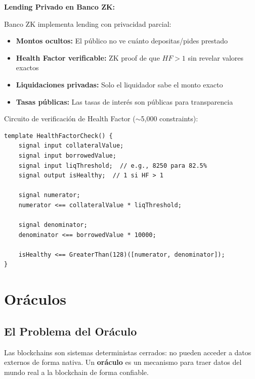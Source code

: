 \documentclass[11pt,a4paper,twoside]{book}
\begin{document}
\begin{bancozk}
\textbf{Lending Privado en Banco ZK:}

Banco ZK implementa lending con privacidad parcial:

\begin{itemize}
    \item \textbf{Montos ocultos:} El p\'ublico no ve cu\'anto depositas/pides prestado
    \item \textbf{Health Factor verificable:} ZK proof de que $HF > 1$ sin revelar valores exactos
    \item \textbf{Liquidaciones privadas:} Solo el liquidador sabe el monto exacto
    \item \textbf{Tasas p\'ublicas:} Las tasas de inter\'es son p\'ublicas para transparencia
\end{itemize}

Circuito de verificaci\'on de Health Factor ($\sim$5,000 constraints):
\begin{verbatim}
template HealthFactorCheck() {
    signal input collateralValue;
    signal input borrowedValue;
    signal input liqThreshold;  // e.g., 8250 para 82.5%
    signal output isHealthy;  // 1 si HF > 1
    
    signal numerator;
    numerator <== collateralValue * liqThreshold;
    
    signal denominator;
    denominator <== borrowedValue * 10000;
    
    isHealthy <== GreaterThan(128)([numerator, denominator]);
}
\end{verbatim}
\end{bancozk}

\section{Or\'aculos}
\label{sec:oracles}

\subsection{El Problema del Or\'aculo}

\begin{definition}
Las blockchains son sistemas deterministas cerrados: no pueden acceder a datos externos de forma nativa. Un \textbf{or\'aculo} es un mecanismo para traer datos del mundo real a la blockchain de forma confiable.
\end{definition}
\end{document}
